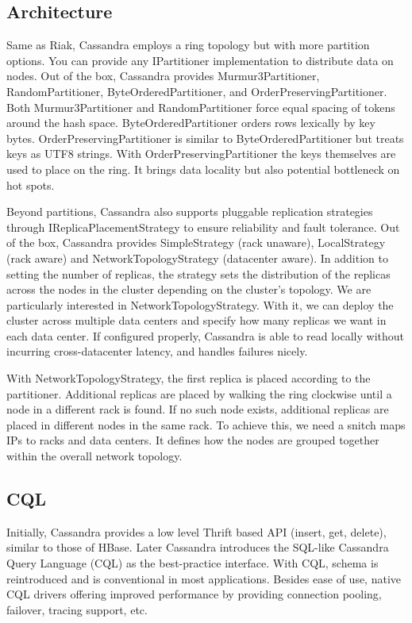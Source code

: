 \documentclass[11pt]{book}
\begin{document}
\subsection{Architecture}

Same as Riak, Cassandra employs a ring topology but with more partition options. You can provide any IPartitioner implementation to distribute data on nodes. Out of the box, Cassandra provides Murmur3Partitioner, RandomPartitioner, ByteOrderedPartitioner, and OrderPreservingPartitioner. Both Murmur3Partitioner and RandomPartitioner  force equal spacing of tokens around the hash space. ByteOrderedPartitioner orders rows lexically by key bytes. OrderPreservingPartitioner is similar to ByteOrderedPartitioner but treats keys as UTF8 strings. With OrderPreservingPartitioner the keys themselves are used to place on the ring. It brings data locality but also potential bottleneck on hot spots.

Beyond partitions, Cassandra also supports pluggable replication strategies through IReplicaPlacementStrategy to ensure reliability and fault tolerance. Out of the box, Cassandra provides SimpleStrategy (rack unaware), LocalStrategy (rack aware) and NetworkTopologyStrategy (datacenter aware). In addition to setting the number of replicas, the strategy sets the distribution of the replicas across the nodes in the cluster depending on the cluster's topology. We are particularly interested in NetworkTopologyStrategy. With it, we can deploy the cluster across multiple data centers and specify how many replicas we want in each data center. If configured properly, Cassandra is able to read locally without incurring cross-datacenter latency, and handles failures nicely.

With NetworkTopologyStrategy, the first replica is placed according to the partitioner.
Additional replicas are placed by walking the ring clockwise until a node in a different rack is found. If no such node exists, additional replicas are placed in different nodes in the same rack.
To achieve this, we need a snitch maps IPs to racks and data centers. It defines how the nodes are grouped together within the overall network topology.

\subsection{CQL}
Initially, Cassandra provides a low level Thrift based API (insert, get, delete), similar to those of HBase. Later Cassandra introduces the SQL-like Cassandra Query Language (CQL) as the best-practice interface. With CQL, schema is reintroduced and is conventional in most applications. Besides ease of use, native CQL drivers offering improved performance by providing connection pooling, failover, tracing support, etc.
\end{document}

